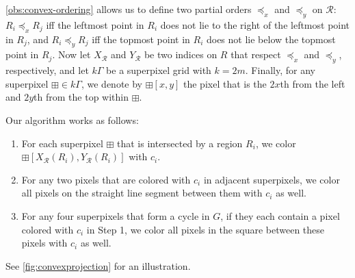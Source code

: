 \documentclass[a4paper,UKenglish,cleveref]{lipics-v2019}
\newcommand{\spix}{\boxplus}
\begin{document}
\cref{obs:convex-ordering} allows us to define two partial orders \(\preceq_x\) and \(\preceq_y\) on \(\mathcal{R}\): \(R_i \preceq_x R_j\) iff the leftmost point in \(R_i\) does not lie to the right of the leftmost point in \(R_j\), and \(R_i \preceq_y R_j\) iff the topmost point in \(R_i\) does not lie below the topmost point in \(R_j\). Now let \(X_\mathcal{R}\) and \(Y_\mathcal{R}\) be two indices on \(R\) that respect \(\preceq_x\) and \(\preceq_y\), respectively, and let \(k\Gamma\) be a superpixel grid with \(k = 2m\). Finally, for any superpixel \(\spix \in k\Gamma\), we denote by \(\spix[x, y]\) the pixel that is the \(2x\)th from the left and \(2y\)th from the top within \(\spix\).

Our algorithm works as follows:

\begin{enumerate}
	\item For each superpixel \(\spix\) that is intersected by a region \(R_i\), we color \(\spix[X_\mathcal{R}(R_i), Y_\mathcal{R}(R_i)]\) with \(c_i\).
	\item For any two pixels that are colored with \(c_i\) in adjacent superpixels, we color all pixels on the straight line segment between them with \(c_i\) as well.
	\item For any four superpixels that form a cycle in \(G\), if they each contain a pixel colored with \(c_i\) in Step 1, we color all pixels in the square between these pixels with \(c_i\) as well.
\end{enumerate}

\noindent
See \cref{fig:convexprojection} for an illustration.
\end{document}
